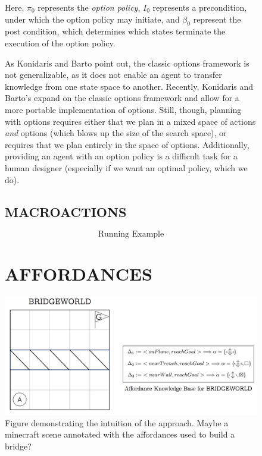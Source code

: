 \documentclass[]{article}
\newcommand{\ignore}[1]{}
\begin{document}
\begin{figure}
Here, $\pi_0$ represents the {\it option policy}, $I_0$ represents a precondition, under which the option policy may initiate, and $\beta_0$ represent the post condition, which determines which states terminate the execution of the option policy.

As Konidaris and Barto point out, the classic options framework is not generalizable, as it does not enable an agent to transfer knowledge from one state space to another. Recently, Konidaris and Barto's \ignore{cite} expand on the classic options framework and allow for a more portable implementation of options. Still, though, planning with options requires either that we plan in a mixed space of actions {\it and} options (which blows up the size of the search space), or requires that we plan entirely in the space of options. Additionally, providing an agent with an option policy is a difficult task for a human designer (especially if we want an optimal policy, which we do).

\subsection{MACROACTIONS}

\[
\boxed{\text{Running Example}}
\]

\section{AFFORDANCES}

\centering
\includegraphics[scale = 0.18]{figures/bridgeworld_annotated.png}
\caption{Figure demonstrating the intuition of the approach.  Maybe a
  minecraft scene annotated with the affordances used to build a
  bridge?\label{fig:example}}
\end{figure}
\end{document}
